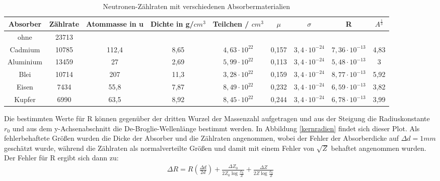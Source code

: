 \begin{table}[h]
	\caption{Neutronen-Zählraten mit verschiedenen Absorbermaterialien}
	\begin{tabular}{|c|c|c|c|c|c|c|c|c|}
	\hline
	 Absorber & Zählrate & Atommasse in u & Dichte in g/$cm^3$ & Teilchen / $cm^3$ & $\mu$ & $\sigma$ & R & $A^\frac{1}{3}$ \\ \hline
	  ohne & 23713 &  &  &  &  & &  &   \\ \hline
	   Cadmium & 10785 & 112,4 & 8,65 & $4,63 \cdot 10^{22}$ & 0,157 & $3,4\cdot 10^{-24}$ & $7,36 \cdot 10^{-13}$ & 4,83\\ \hline
	    Aluminium & 13459 & 27 & 2,69 & $5,99 \cdot 10^{22}$ & 0,113 & $3,4\cdot 10^{-24}$ & $5,48 \cdot 10^{-13}$  & 3 \\ \hline
	     Blei & 10714 & 207 & 11,3 & $3,28 \cdot 10^{22}$ & 0,159 & $3,4\cdot 10^{-24}$ & $8,77 \cdot 10^{-13}$  & 5,92 \\ \hline
	      Eisen & 7434 & 55,8 & 7,87 & $8,49 \cdot 10^{22}$ & 0,232 & $3,4\cdot 10^{-24}$ & $6,59 \cdot 10^{-13}$  & 3,82 \\ \hline
	       Kupfer & 6990 & 63,5 & 8,92 & $8,45 \cdot 10^{22}$ & 0,244 & $3,4\cdot 10^{-24}$ & $6,78 \cdot 10^{-13}$  & 3,99\\ \hline
	\end{tabular}
\label{werte}
\end{table}

Die bestimmten Werte für R können gegenüber der dritten Wurzel der Massenzahl aufgetragen und aus der Steigung die Radiuskonstante $r_0$ und aus dem y-Achsenabschnitt die De-Broglie-Wellenlänge bestimmt werden. In Abbildung \ref{kernradien} findet sich dieser Plot. Als fehlerbehaftete Größen wurden die Dicke der Absorber und die Zählraten angenommen, wobei der Fehler der Absorberdicke auf $\Delta d = 1mm$ geschätzt wurde, während die Zählraten als normalverteilte Größen und damit mit einem Fehler von $\sqrt{Z}$ behaftet angenommen wurden. Der Fehler für R ergibt sich dann zu:
\begin{align} 
\Delta R = R \left(\frac{\Delta d}{2d}\right) + \frac{\Delta Z_0}{2Z_0\log\frac{Z_0}{Z}}+\frac{\Delta Z}{2Z\log\frac{Z_0}{Z}}
\end{align}

